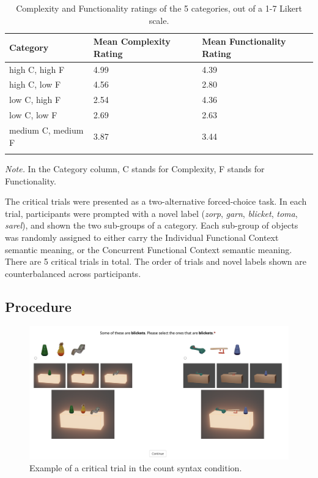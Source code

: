 \documentclass[
  man,floatsintext]{apa6}
\begin{document}
\begin{table}[tbp]

\begin{center}
\begin{threeparttable}

\caption{\label{tab:unnamed-chunk-1}Complexity and Functionality ratings of the 5 categories, out of a 1-7 Likert scale.}

\begin{tabular}{lll}
\toprule
Category & Mean Complexity Rating & Mean Functionality Rating\\
\midrule
high C, high F & 4.99 & 4.39\\
high C, low F & 4.56 & 2.80\\
low C, high F & 2.54 & 4.36\\
low C, low F & 2.69 & 2.63\\
medium C, medium F & 3.87 & 3.44\\
\bottomrule
\addlinespace
\end{tabular}

\begin{tablenotes}[para]
\normalsize{\textit{Note.} In the Category column, C stands for Complexity, F stands for Functionality.}
\end{tablenotes}

\end{threeparttable}
\end{center}

\end{table}

The critical trials were presented as a two-alternative forced-choice task. In each trial, participants were prompted with a novel label (\emph{zorp}, \emph{garn}, \emph{blicket}, \emph{toma}, \emph{sarel}), and shown the two sub-groups of a category. Each sub-group of objects was randomly assigned to either carry the Individual Functional Context semantic meaning, or the Concurrent Functional Context semantic meaning. There are 5 critical trials in total. The order of trials and novel labels shown are counterbalanced across participants.

\hypertarget{procedure}{%
\subsection{Procedure}\label{procedure}}

\begin{figure}
\centering
\includegraphics{figs/exp.png}
\caption{\label{fig:my-figure}Example of a critical trial in the count syntax condition.}
\end{figure}
\end{document}
